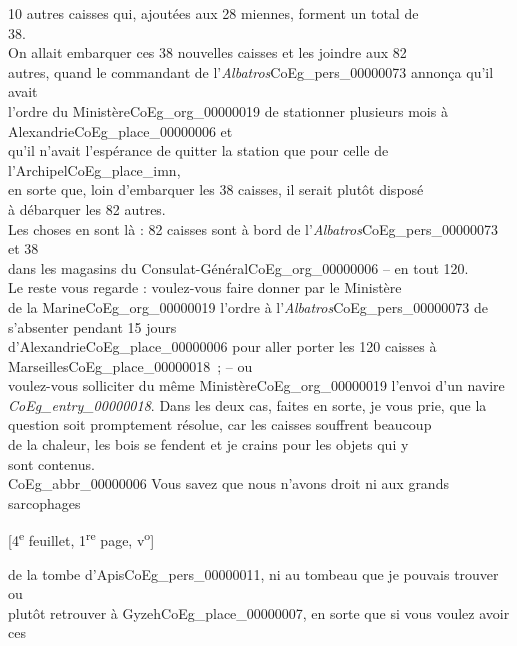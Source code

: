 \documentclass{book}
\begin{document}
10 autres caisses qui, ajoutées aux 28 miennes, forment un total de\\
38.\\
\indent On allait embarquer ces 38 nouvelles caisses et les joindre aux 82\\
autres, quand le commandant de l’\textit{Albatros}\gls{CoEg_pers_00000073} annonça qu’il avait\\
l’ordre du Ministère\gls{CoEg_org_00000019} de stationner plusieurs mois à Alexandrie\gls{CoEg_place_00000006} et\\
qu’il n’avait l’espérance de quitter la station que pour celle de l’Archipel\gls{CoEg_place_imn},\\
en sorte que, loin d’embarquer les 38 caisses, il serait plutôt disposé\\
à débarquer les 82 autres.\\
\indent Les choses en sont là : 82 caisses sont à bord de l’\textit{Albatros}\gls{CoEg_pers_00000073} et 38\\
dans les magasins du Consulat-Général\gls{CoEg_org_00000006} – en tout 120.\\
\indent Le reste vous regarde : voulez-vous faire donner par le Ministère\\
de la Marine\gls{CoEg_org_00000019} l’ordre à l’\textit{Albatros}\gls{CoEg_pers_00000073} de s’absenter pendant 15 jours\\
d’Alexandrie\gls{CoEg_place_00000006} pour aller porter les 120 caisses à Marseilles\gls{CoEg_place_00000018}~; – ou\\
voulez-vous solliciter du même Ministère\gls{CoEg_org_00000019} l’envoi d’un navire\\
\textit{\gls{CoEg_entry_00000018}}. Dans les deux cas, faites en sorte, je vous prie, que la\\
question soit promptement résolue, car les caisses souffrent beaucoup\\
de la chaleur, les bois se fendent et je crains pour les objets qui y\\
sont contenus.\\
\indent \gls{CoEg_abbr_00000006} Vous savez que nous n’avons droit ni aux grands sarcophages
{\footnotesize\begin{center} {[4\textsuperscript{e} feuillet, 1\textsuperscript{re} page, v\textsuperscript{o}]}\end{center}}
\noindent de la tombe d’Apis\gls{CoEg_pers_00000011}, ni au tombeau que je pouvais trouver ou\\
plutôt retrouver à Gyzeh\gls{CoEg_place_00000007}, en sorte que si vous voulez avoir ces\\
\end{document}
